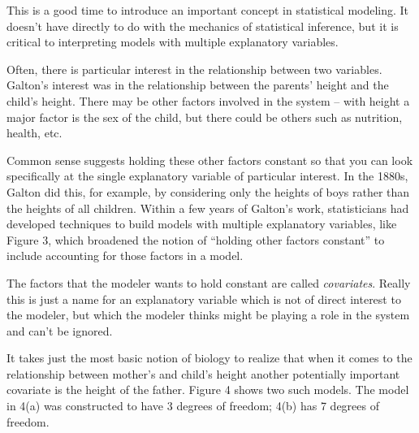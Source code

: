 \documentclass[]{tufte-book}
\begin{document}
This is a good time to introduce an important concept in statistical modeling. It doesn't have directly to do with the mechanics of statistical inference, but it is critical to interpreting models with multiple explanatory variables.

Often, there is particular interest in the relationship between two variables. Galton's interest was in the relationship between the parents' height and the child's height. There may be other factors involved in the system -- with height a major factor is the sex of the child, but there could be others such as nutrition, health, etc.

Common sense suggests holding these other factors constant so that you can look specifically at the single explanatory variable of particular interest. In the 1880s, Galton did this, for example, by considering only the heights of boys rather than the heights of all children. Within a few years of Galton's work, statisticians had developed techniques to build models with multiple explanatory variables, like Figure 3, which broadened the notion of ``holding other factors constant'' to include accounting for those factors in a model.

The factors that the modeler wants to hold constant are called \emph{covariates}. Really this is just a name for an explanatory variable which is not of direct interest to the modeler, but which the modeler thinks might be playing a role in the system and can't be ignored.

It takes just the most basic notion of biology to realize that when it comes to the relationship between mother's and child's height another potentially important covariate is the height of the father. Figure 4 shows two such models. The model in 4(a) was constructed to have 3 degrees of freedom; 4(b) has 7 degrees of freedom.
\end{document}
